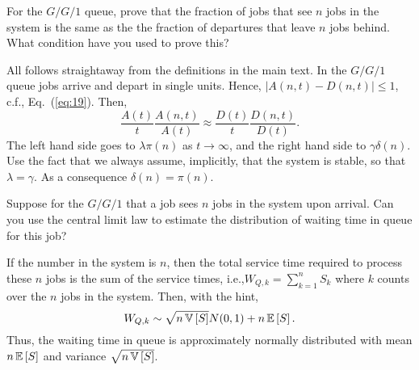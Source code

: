 \begin{question}
  For the $G/G/1$ queue, prove that the fraction of jobs that see $n$
  jobs in the system is the same as the the fraction of departures that
  leave $n$ jobs behind. What condition have you used to prove this?
  \begin{solution}
    All follows straightaway from the definitions in the main text. In
    the $G/G/1$ queue jobs arrive and depart in single units. Hence,
    $|A(n,t)-D(n,t)|\leq 1$, c.f., Eq.~(\ref{eq:19}). Then, 
    \begin{equation*}
      \frac{A(t)}{t}\frac{A(n,t)}{A(t)} \approx 
      \frac{D(t)}{t}\frac{D(n,t)}{D(t)}. 
    \end{equation*}
    The left hand side goes to $\lambda \pi(n)$ as $t\to\infty$, and
    the right hand side to $\gamma \delta(n)$. Use the fact that we
    always assume, implicitly, that the system is stable, so that
    $\lambda = \gamma$. As a consequence $\delta(n) = \pi(n)$.
  \end{solution}
\end{question}

\begin{question}
  Suppose for the $G/G/1$ that a job sees $n$ jobs in the system upon
  arrival. Can you use the central limit law to estimate the
  distribution of waiting time in queue for this job?  


\begin{solution} If the number in the system is $n$, then the total
  service time required to process these $n$ jobs is the sum of the
  service times, i.e.,$W_{Q,k} = \sum_{k=1}^n S_k$ where $k$ counts over the
  $n$ jobs in the system. Then, with the hint,
  \begin{equation*}
    W_{Q, k} \sim \sqrt{n \,\mathbb{V}\left[S\right]} N(0,1) + n \,\mathbb{E}\left[S\right].
  \end{equation*}
Thus, the waiting time in queue is approximately normally distributed with mean $n \,\mathbb{E}\left[S\right]$ and variance $\sqrt{n \,\mathbb{V}\left[S\right]}$. 
\end{solution}
\end{question}


